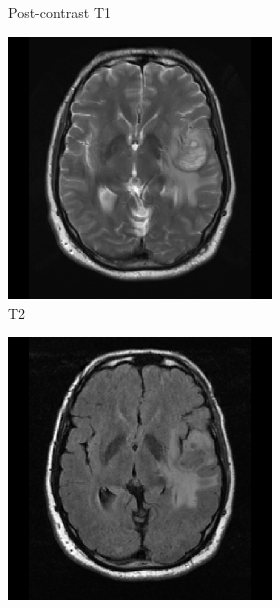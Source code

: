 \begin{subappendices}
\begin{figure}
\begin{subfigure}[b]{0.88\textwidth}
\begin{subfigure}[b]{0.24\textwidth}
        \caption*{Post-contrast \acrshort{T1}}
        \end{subfigure}
        \hfill
        \begin{subfigure}[b]{0.24\textwidth}
        \includegraphics[width=\textwidth]{Figures/TCGA-06-0238_T2.png}
        \caption*{\acrshort{T2}}
        \end{subfigure}
        \hfill
        \begin{subfigure}[b]{0.24\textwidth}
        \includegraphics[width=\textwidth]{Figures/TCGA-06-0238_FLAIR.png}

\end{subfigure}
\end{subfigure}
\end{figure}
\end{subappendices}
